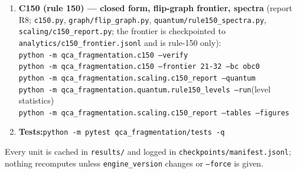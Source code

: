 \documentclass[11pt]{article}
\newcommand{\rt}[1]{\texttt{#1}}
\newcommand{\pf}[1]{\texttt{#1}}          %
\begin{document}
\begin{enumerate}
  \rt{python -m qca\_fragmentation.scaling.pair\_figure --bc pbc}\qquad(coverage / sandwich / parity)
\item \textbf{C150 (rule 150) --- closed form, flip-graph frontier, spectra}
  (report R8; \pf{c150.py}, \pf{graph/flip\_graph.py},
  \pf{quantum/rule150\_spectra.py}, \pf{scaling/c150\_report.py}; the frontier is
  checkpointed to \rt{analytics/c150\_frontier.jsonl} and is rule-150 only):\\
  \rt{python -m qca\_fragmentation.c150 --verify}\\
  \rt{python -m qca\_fragmentation.c150 --frontier 21-32 --bc obc0}\\
  \rt{python -m qca\_fragmentation.scaling.c150\_report --quantum}\\
  \rt{python -m qca\_fragmentation.quantum.rule150\_levels --run}\qquad(level
  statistics)\\
  \rt{python -m qca\_fragmentation.scaling.c150\_report --tables --figures}
\item \textbf{Tests:}\quad\rt{python -m pytest qca\_fragmentation/tests -q}
\end{enumerate}
Every unit is cached in \pf{results/} and logged in
\pf{checkpoints/manifest.jsonl}; nothing recomputes unless
\rt{engine\_version} changes or \rt{--force} is given.
\end{document}
